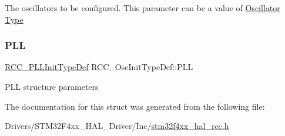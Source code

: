 The oscillators to be configured. This parameter can be a value of \hyperlink{group___r_c_c___oscillator___type}{Oscillator Type} \mbox{\label{struct_r_c_c___osc_init_type_def_af76de5ee86798f0c3a4c83c84dfa58be}} 
\subsubsection{\texorpdfstring{P\+LL}{PLL}}
{\footnotesize\ttfamily \hyperlink{struct_r_c_c___p_l_l_init_type_def}{R\+C\+C\+\_\+\+P\+L\+L\+Init\+Type\+Def} R\+C\+C\+\_\+\+Osc\+Init\+Type\+Def\+::\+P\+LL}

P\+LL structure parameters 

The documentation for this struct was generated from the following file\+:\begin{DoxyCompactItemize}
\item 
Drivers/\+S\+T\+M32\+F4xx\+\_\+\+H\+A\+L\+\_\+\+Driver/\+Inc/\hyperlink{stm32f4xx__hal__rcc_8h}{stm32f4xx\+\_\+hal\+\_\+rcc.\+h}\end{DoxyCompactItemize}
